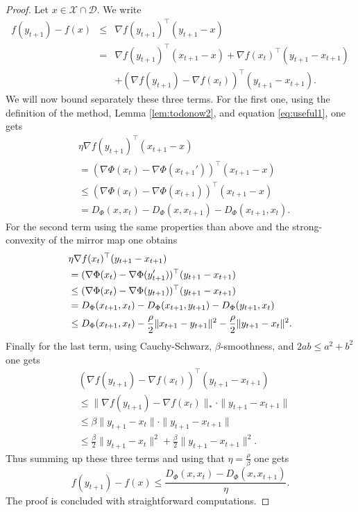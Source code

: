\begin{proof}
Let $x \in \mathcal{X} \cap \mathcal{D}$. We write
\begin{eqnarray*}
f(y_{t+1}) - f(x) & \leq & \nabla f(y_{t+1})^{\top} (y_{t+1} - x) \\
& = & \nabla f(y_{t+1})^{\top} (x_{t+1} - x) + \nabla f(x_t)^{\top} (y_{t+1} - x_{t+1}) \\
& & + (\nabla f(y_{t+1}) - \nabla f(x_t))^{\top} (y_{t+1} - x_{t+1}) .
\end{eqnarray*}
We will now bound separately these three terms. For the first one, using the definition of the method, Lemma \ref{lem:todonow2}, and equation \eqref{eq:useful1}, one gets
\begin{align*}
& \eta \nabla f(y_{t+1})^{\top} (x_{t+1} - x) \\
& = ( \nabla \Phi(x_t) - \nabla \Phi(x_{t+1}'))^{\top} (x_{t+1} - x) \\
& \leq ( \nabla \Phi(x_t) - \nabla \Phi(x_{t+1}))^{\top} (x_{t+1} - x) \\
& = D_{\Phi}(x,x_t) - D_{\Phi}(x, x_{t+1}) - D_{\Phi}(x_{t+1}, x_t) .
\end{align*}
For the second term using the same properties than above and the strong-convexity of the mirror map one obtains
\begin{align}
& \eta \nabla f(x_t)^{\top} (y_{t+1} - x_{t+1}) \notag\\
& = ( \nabla \Phi(x_t) - \nabla \Phi(y_{t+1}'))^{\top} (y_{t+1} - x_{t+1}) \notag\\
& \leq ( \nabla \Phi(x_t) - \nabla \Phi(y_{t+1}))^{\top} (y_{t+1} - x_{t+1}) \notag\\
& = D_{\Phi}(x_{t+1},x_t) - D_{\Phi}(x_{t+1}, y_{t+1}) - D_{\Phi}(y_{t+1}, x_t) \label{eq:pourplustard1}\\
& \leq D_{\Phi}(x_{t+1},x_t) - \frac{\rho}{2} \|x_{t+1} - y_{t+1} \|^2 - \frac{\rho}{2} \|y_{t+1} - x_t\|^2 . \notag
\end{align}
Finally for the last term, using Cauchy-Schwarz, $\beta$-smoothness, and $2 ab \leq a^2 + b^2$ one gets
\begin{align*}
& (\nabla f(y_{t+1}) - \nabla f(x_t))^{\top} (y_{t+1} - x_{t+1}) \\
& \leq \|\nabla f(y_{t+1}) - \nabla f(x_t)\|_*  \cdot \|y_{t+1} - x_{t+1} \| \\
& \leq \beta \|y_{t+1} - x_t\| \cdot \|y_{t+1} - x_{t+1} \| \\
& \leq \frac{\beta}{2} \|y_{t+1} - x_t\|^2 + \frac{\beta}{2}  \|y_{t+1} - x_{t+1} \|^2 . 
\end{align*}
Thus summing up these three terms and using that $\eta = \frac{\rho}{\beta}$ one gets
$$f(y_{t+1}) - f(x) \leq \frac{D_{\Phi}(x,x_t) - D_{\Phi}(x,x_{t+1})}{\eta} .$$
The proof is concluded with straightforward computations.
\end{proof}

